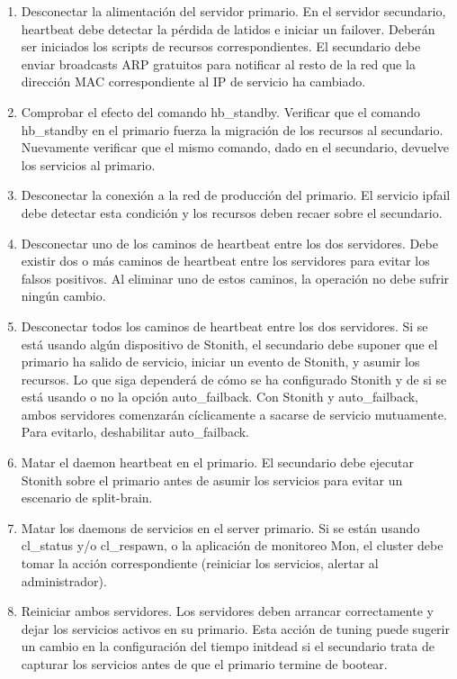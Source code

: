 \begin{enumerate}
	\item Desconectar la alimentación del servidor primario.
En el servidor secundario, heartbeat debe detectar la pérdida de latidos e iniciar un failover. Deberán ser iniciados los scripts de recursos correspondientes. El secundario debe enviar broadcasts ARP gratuitos para notificar al resto de la red que la dirección MAC correspondiente al IP de servicio ha cambiado.
	\item Comprobar el efecto del comando hb\_standby.
Verificar que el comando hb\_standby en el primario fuerza la migración de los recursos al secundario. Nuevamente verificar que el mismo comando, dado en el secundario, devuelve los servicios al primario.
	\item Desconectar la conexión a la red de producción del primario.
El servicio ipfail debe detectar esta condición y los recursos deben recaer sobre el secundario.
	\item Desconectar uno de los caminos de heartbeat entre los dos servidores.
Debe existir dos o más caminos de heartbeat entre los servidores para evitar los falsos positivos. Al eliminar uno de estos caminos, la operación no debe sufrir ningún cambio.
	\item Desconectar todos los caminos de heartbeat entre los dos servidores.
Si se está usando algún dispositivo de Stonith, el secundario debe suponer que el primario ha salido de servicio, iniciar un evento de Stonith, y asumir los recursos. Lo que siga dependerá de cómo se ha configurado Stonith y de si se está usando o no la opción auto\_failback. Con Stonith y auto\_failback, ambos servidores comenzarán cíclicamente a sacarse de servicio mutuamente. Para evitarlo, deshabilitar auto\_failback.
	\item Matar el daemon heartbeat en el primario.
El secundario debe ejecutar Stonith sobre el primario antes de asumir los servicios para evitar un escenario de split-brain.
	\item Matar los daemons de servicios en el server primario.
Si se están usando cl\_status y/o cl\_respawn, o la aplicación de monitoreo Mon, el cluster debe tomar la acción correspondiente (reiniciar los servicios, alertar al administrador).
	\item Reiniciar ambos servidores.
Los servidores deben arrancar correctamente y dejar los servicios activos en su primario. Esta acción de tuning puede sugerir un cambio en la configuración del tiempo initdead si el secundario trata de capturar los servicios antes de que el primario termine de bootear. 
\end{enumerate}
